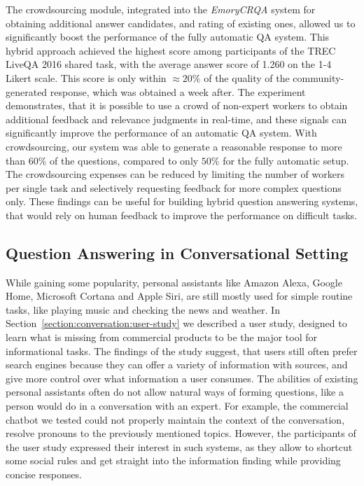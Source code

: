 The crowdsourcing module, integrated into the \textit{EmoryCRQA} system for obtaining additional answer candidates, and rating of existing ones, allowed us to significantly boost the performance of the fully automatic QA system.
This hybrid approach achieved the highest score among participants of the TREC LiveQA 2016 shared task, with the average answer score of 1.260 on the 1-4 Likert scale.
This score is only within $\approx 20\%$ of the quality of the community-generated response, which was obtained a week after.
The experiment demonstrates, that it is possible to use a crowd of non-expert workers to obtain additional feedback and relevance judgments in real-time, and these signals can significantly improve the performance of an automatic QA system.
With crowdsourcing, our system was able to generate a reasonable response to more than $60\%$ of the questions, compared to only $50\%$ for the fully automatic setup.
The crowdsourcing expenses can be reduced by limiting the number of workers per single task and selectively requesting feedback for more complex questions only.
These findings can be useful for building hybrid question answering systems, that would rely on human feedback to improve the performance on difficult tasks.


\subsection{Question Answering in Conversational Setting}
\label{section:conclusion:summary:conversation}

While gaining some popularity, personal assistants like Amazon Alexa, Google Home, Microsoft Cortana and Apple Siri, are still mostly used for simple routine tasks, like playing music and checking the news and weather.
In Section~\ref{section:conversation:user-study} we described a user study, designed to learn what is missing from commercial products to be the major tool for informational tasks.
The findings of the study suggest, that users still often prefer search engines because they can offer a variety of information with sources, and give more control over what information a user consumes.
The abilities of existing personal assistants often do not allow natural ways of forming questions, like a person would do in a conversation with an expert.
For example, the commercial chatbot we tested could not properly maintain the context of the conversation, \eg resolve pronouns to the previously mentioned topics.
However, the participants of the user study expressed their interest in such systems, as they allow to shortcut some social rules and get straight into the information finding while providing concise responses.

